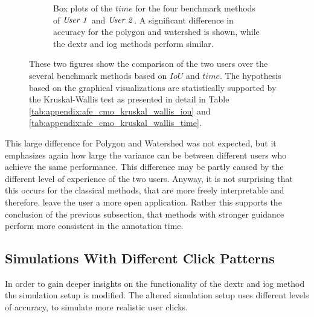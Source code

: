 \begin{figure} [h!]
\begin{subfigure}[t]{0.45\textwidth}
 		\caption{
 			Box plots of the $ time $ for the four benchmark methods of $ \textnormal{\textit{User 1}} $ and $ \textnormal{\textit{User 2}} $.
 			A significant difference in accuracy for the polygon and watershed is shown, while the \gls{dextr} and \gls{iog} methods perform similar.
 		}\label{fig:ch5:sec3:cmo_afe_time}
 	\end{subfigure}
 	\caption[Box plots of two experienced user on $ IoU $ and $ time$.]{		
 		These two figures show the comparison of the two users over the several benchmark methods based on $ IoU $ and $ time $.
 		The hypothesis based on the graphical visualizations are statistically supported by the Kruskal-Wallis test as presented in detail in Table \ref{tab:appendix:afe_cmo_kruskal_wallis_iou} and \ref{tab:appendix:afe_cmo_kruskal_wallis_time}.
 	}\label{fig:ch5:sec3:cmo_afe}
\end{figure}

This large difference for Polygon and Watershed was not expected, but it emphasizes again how large the variance can be between different users who achieve the same performance.
This difference may be partly caused by the different level of experience of the two users.
Anyway, it is not surprising that this occurs for the classical methods, that are more freely interpretable and therefore. leave the user a more open application.
Rather this supports the conclusion of the previous subsection, that methods with stronger guidance perform more consistent in the annotation time.


\subsection{Simulations With Different Click Patterns}\label{ord:ch5:sec3:subsec3}



In order to gain deeper insights on the functionality of the \gls{dextr} and \gls{iog} method the simulation setup is modified.
The altered simulation setup uses different levels of accuracy, to simulate more realistic user clicks.

